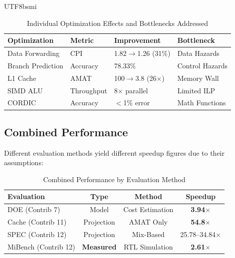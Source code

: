 \documentclass[journal,twoside]{IEEEtran}
\begin{document}
\begin{CJK}{UTF8}{bsmi}
\begin{table}[!t]
\centering
\caption{Individual Optimization Effects and Bottlenecks Addressed}
\footnotesize
\begin{tabular}{@{}llll@{}}
\toprule
\textbf{Optimization} & \textbf{Metric} & \textbf{Improvement} & \textbf{Bottleneck} \\
\midrule
Data Forwarding & CPI & 1.82$\rightarrow$1.26 (31\%) & Data Hazards \\
Branch Prediction & Accuracy & 78.33\% & Control Hazards \\
L1 Cache & AMAT & 100$\rightarrow$3.8 (26$\times$) & Memory Wall \\
SIMD ALU & Throughput & 8$\times$ parallel & Limited ILP \\
CORDIC & Accuracy & $<$1\% error & Math Functions \\
\bottomrule
\end{tabular}
\end{table}

\subsection{Combined Performance}
Different evaluation methods yield different speedup figures due to their assumptions:

\begin{table}[!t]
\centering
\caption{Combined Performance by Evaluation Method}
\footnotesize
\begin{tabular}{@{}lccc@{}}
\toprule
\textbf{Evaluation} & \textbf{Type} & \textbf{Method} & \textbf{Speedup} \\
\midrule
DOE (Contrib 7) & Model & Cost Estimation & \textbf{3.94$\times$} \\
Cache (Contrib 11) & Projection & AMAT Only & \textbf{54.8$\times$} \\
SPEC (Contrib 12) & Projection & Mix-Based & 25.78--34.84$\times$ \\
MiBench (Contrib 12) & \textbf{Measured} & RTL Simulation & \textbf{2.61$\times$} \\
\bottomrule
\end{tabular}
\end{table}


\end{CJK}
\end{document}
